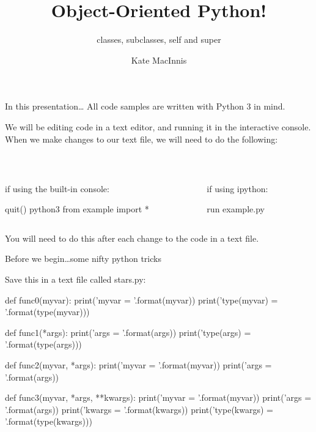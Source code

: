 \documentclass[aspectratio=149, handout] {beamer}
\title[OOP!]{Object-Oriented Python!}
\subtitle{classes, subclasses, self and super}
\author{Kate MacInnis}
\institute{PyLadies-ATX Tech Talk\\September 3, 2015}
\date{}
\begin{document}
\begin{frame}
\titlepage
\end{frame}


\begin{frame}[fragile]{In this presentation\dots}
  All code samples are written with Python 3 in mind.
  
  \bigskip
  
  
  We will be editing code in a text editor, and running it in the interactive console. When we make changes to our text file, we will need to do the following:
  
  ~\hfill
  \begin{columns}
    \begin{column}[t]{.4\textwidth}
      {\small if using the built-in console:}
      \begin{codeblock}
        quit()
        python3
        from example import *
      \end{codeblock}
    \end{column}
   
    \begin{column}[t]{.4\textwidth}
      {\small if using ipython:}
      \begin{codeblock}
        run example.py
      \end{codeblock}
    \end{column}
  \end{columns}
  
  \bigskip
  
  
  You will need to do this after each change to the code in a text file.
  
  
\end{frame}



\begin{frame}[fragile]{Before we begin\dots some nifty python tricks}

  Save this in a text file called stars.py:
  
  \begin{smallpythoncode}
    def func0(myvar):
        print('myvar = {}'.format(myvar))
        print('type(myvar) = {}'.format(type(myvar)))
    
    def func1(*args):
        print('args = {}'.format(args))
        print('type(args) = {}'.format(type(args)))
    
    def func2(myvar, *args):
        print('myvar = {}'.format(myvar))
        print('args = {}'.format(args))
    
    def func3(myvar, *args, **kwargs):
        print('myvar = {}'.format(myvar))
        print('args = {}'.format(args))
        print('kwargs = {}'.format(kwargs))
        print('type(kwargs) = {}'.format(type(kwargs)))
  \end{smallpythoncode}


\end{frame}
\end{document}

